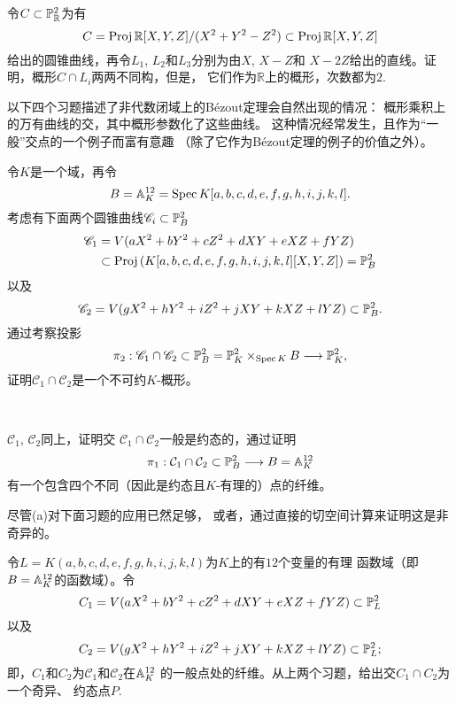 \begin{exe}\label{exe:3.72}
令$C\subset \P_{\mathbb R}^2$为有
\[
	C=\proj \mathbb R[X,Y,Z]/(X^2+Y^2-Z^2)
	\subset \proj \mathbb R[X,Y,Z]
\]
给出的圆锥曲线，再令$L_1$, $L_2$和$L_3$分别为由$X$, $X-Z$和
$X-2Z$给出的直线。证明，概形$C\cap L_i$两两不同构，但是，
它们作为$\mathbb R$上的概形，次数都为$2$.
\end{exe}


以下四个习题描述了非代数闭域上的B\'ezout定理会自然出现的情况：
概形乘积上的万有曲线的交，其中概形参数化了这些曲线。
这种情况经常发生，且作为“一般”交点的一个例子而富有意趣
（除了它作为B\'ezout定理的例子的价值之外）。

\begin{exe}\label{exe:3.73}
令$K$是一个域，再令
\[
	B=\A_K^{12}=\spec K[a,b,c,d,e,f,g,h,i,j,k,l].
\]
考虑有下面两个圆锥曲线$\mathscr C_i\subset \P_B^2$
\begin{align*}
	\mathscr C_1&=V(aX^2+bY^2+cZ^2+dXY+eXZ+fYZ)\\
	&\subset \proj\left(
	K[a,b,c,d,e,f,g,h,i,j,k,l][X,Y,Z]
	\right)=\P_B^2
\end{align*}
以及
\[
	\mathscr C_2=
	V(gX^2+hY^2+iZ^2+jXY+kXZ+lYZ)\subset \P_B^2.
\]
通过考察投影
\[
	\pi_2:\mathscr C_1\cap \mathscr C_2
	\subset \P_B^2=\P_K^2\times_{\spec K}B
	\longrightarrow \P_K^2,
\]
证明$\mathscr C_1\cap \mathscr C_2$是一个不可约$K$-概形。
\end{exe}

\begin{exe}~\label{exe:3.74}
\begin{compactenum}[(a)]
	\item $\mathscr C_1$, $\mathscr C_2$同上，证明交
	$\mathscr C_1\cap \mathscr C_2$一般是约态的，通过证明
	\[
		\pi_1:\mathcal C_1\cap \mathcal C_2\subset \P_B^2
		\longrightarrow B=\A_K^{12}
	\]
	有一个包含四个不同（因此是约态且$K$-有理的）点的纤维。
	\item 尽管(a)对下面习题的应用已然足够，\nottran
	或者，通过直接的切空间计算来证明这是非奇异的。
\end{compactenum}
\end{exe}

\begin{exe}\label{exe:3.75}
令$L=K(a,b,c,d,e,f,g,h,i,j,k,l)$为$K$上的有$12$个变量的有理
函数域（即$B=\A_K^{12}$的函数域）。令
\[
	C_1=V(aX^2+bY^2+cZ^2+dXY+eXZ+fYZ)\subset \P_L^2
\]
以及
\[
	C_2=V(gX^2+hY^2+iZ^2+jXY+kXZ+lYZ)\subset \P_L^2;
\]
即，$C_1$和$C_2$为$\mathscr C_1$和$\mathscr C_2$在$\A_K^{12}$
的一般点处的纤维。从上两个习题，给出交$C_1\cap C_2$为一个奇异、
约态点$P$.
\end{exe}

